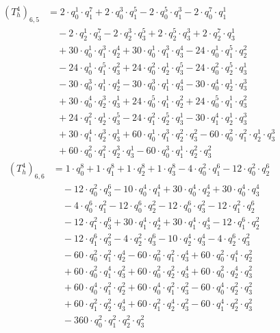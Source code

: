 \begin{align*}(T_{h}^4)_{6,5}&=2\cdot q_0^{1}\cdot q_1^{7}+2\cdot q_0^{3}\cdot q_1^{5}-2\cdot q_0^{5}\cdot q_1^{3}-2\cdot q_0^{7}\cdot q_1^{1}\\
&\quad -2\cdot q_2^{1}\cdot q_3^{7}-2\cdot q_2^{3}\cdot q_3^{5}+2\cdot q_2^{5}\cdot q_3^{3}+2\cdot q_2^{7}\cdot q_3^{1}\\
&\quad +30\cdot q_0^{1}\cdot q_1^{3}\cdot q_2^{4}+30\cdot q_0^{1}\cdot q_1^{3}\cdot q_3^{4}-24\cdot q_0^{1}\cdot q_1^{5}\cdot q_2^{2}\\
&\quad -24\cdot q_0^{1}\cdot q_1^{5}\cdot q_3^{2}+24\cdot q_0^{2}\cdot q_2^{1}\cdot q_3^{5}-24\cdot q_0^{2}\cdot q_2^{5}\cdot q_3^{1}\\
&\quad -30\cdot q_0^{3}\cdot q_1^{1}\cdot q_2^{4}-30\cdot q_0^{3}\cdot q_1^{1}\cdot q_3^{4}-30\cdot q_0^{4}\cdot q_2^{1}\cdot q_3^{3}\\
&\quad +30\cdot q_0^{4}\cdot q_2^{3}\cdot q_3^{1}+24\cdot q_0^{5}\cdot q_1^{1}\cdot q_2^{2}+24\cdot q_0^{5}\cdot q_1^{1}\cdot q_3^{2}\\
&\quad +24\cdot q_1^{2}\cdot q_2^{1}\cdot q_3^{5}-24\cdot q_1^{2}\cdot q_2^{5}\cdot q_3^{1}-30\cdot q_1^{4}\cdot q_2^{1}\cdot q_3^{3}\\
&\quad +30\cdot q_1^{4}\cdot q_2^{3}\cdot q_3^{1}+60\cdot q_0^{1}\cdot q_1^{3}\cdot q_2^{2}\cdot q_3^{2}-60\cdot q_0^{2}\cdot q_1^{2}\cdot q_2^{1}\cdot q_3^{3}\\
&\quad +60\cdot q_0^{2}\cdot q_1^{2}\cdot q_2^{3}\cdot q_3^{1}-60\cdot q_0^{3}\cdot q_1^{1}\cdot q_2^{2}\cdot q_3^{2}\end{align*}
\begin{align*}(T_{h}^4)_{6,6}&=1\cdot q_0^{8}+1\cdot q_1^{8}+1\cdot q_2^{8}+1\cdot q_3^{8}-4\cdot q_0^{2}\cdot q_1^{6}-12\cdot q_0^{2}\cdot q_2^{6}\\
&\quad -12\cdot q_0^{2}\cdot q_3^{6}-10\cdot q_0^{4}\cdot q_1^{4}+30\cdot q_0^{4}\cdot q_2^{4}+30\cdot q_0^{4}\cdot q_3^{4}\\
&\quad -4\cdot q_0^{6}\cdot q_1^{2}-12\cdot q_0^{6}\cdot q_2^{2}-12\cdot q_0^{6}\cdot q_3^{2}-12\cdot q_1^{2}\cdot q_2^{6}\\
&\quad -12\cdot q_1^{2}\cdot q_3^{6}+30\cdot q_1^{4}\cdot q_2^{4}+30\cdot q_1^{4}\cdot q_3^{4}-12\cdot q_1^{6}\cdot q_2^{2}\\
&\quad -12\cdot q_1^{6}\cdot q_3^{2}-4\cdot q_2^{2}\cdot q_3^{6}-10\cdot q_2^{4}\cdot q_3^{4}-4\cdot q_2^{6}\cdot q_3^{2}\\
&\quad -60\cdot q_0^{2}\cdot q_1^{2}\cdot q_2^{4}-60\cdot q_0^{2}\cdot q_1^{2}\cdot q_3^{4}+60\cdot q_0^{2}\cdot q_1^{4}\cdot q_2^{2}\\
&\quad +60\cdot q_0^{2}\cdot q_1^{4}\cdot q_3^{2}+60\cdot q_0^{2}\cdot q_2^{2}\cdot q_3^{4}+60\cdot q_0^{2}\cdot q_2^{4}\cdot q_3^{2}\\
&\quad +60\cdot q_0^{4}\cdot q_1^{2}\cdot q_2^{2}+60\cdot q_0^{4}\cdot q_1^{2}\cdot q_3^{2}-60\cdot q_0^{4}\cdot q_2^{2}\cdot q_3^{2}\\
&\quad +60\cdot q_1^{2}\cdot q_2^{2}\cdot q_3^{4}+60\cdot q_1^{2}\cdot q_2^{4}\cdot q_3^{2}-60\cdot q_1^{4}\cdot q_2^{2}\cdot q_3^{2}\\
&\quad -360\cdot q_0^{2}\cdot q_1^{2}\cdot q_2^{2}\cdot q_3^{2}\end{align*}
